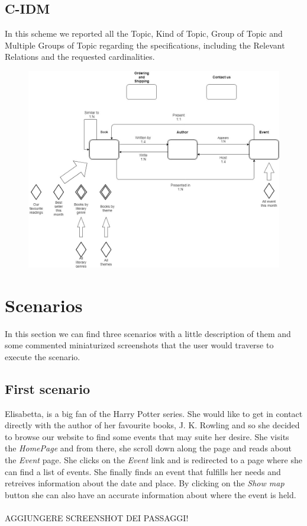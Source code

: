 \documentclass[12pt,a4paper]{article}
\begin{document}
\subsection{C-IDM}
In this scheme we reported all the Topic, Kind of Topic, Group of Topic and Multiple Groups of Topic regarding the specifications, including the Relevant Relations and the requested cardinalities.
\begin{figure}[h!]
\centering
\includegraphics[width=0.9\linewidth]{imm.jpg}
\label{fig:IDM}
\end{figure}

\newpage
\section{Scenarios}
In this section we can find three scenarios with a little description of them and some commented miniaturized screenshots that the user would traverse to execute the scenario.
\subsection{First scenario}
Elisabetta, is a big fan of the Harry Potter series. She would like to get in contact directly with the author of her favourite books, J. K. Rowling and so she decided to browse our website to find some events that may suite her desire. She visits the \textit{HomePage} and from there, she scroll down along the page and reads about the \textit{Event} page. She clicks on the \textit{Event} link and is redirected to a page where she can find a list of events. She finally finds an event that fulfills her needs and retreives information about the date and place. By clicking on the \textit{Show map} button she can also have an accurate information about where the event is held.\\\\
AGGIUNGERE SCREENSHOT DEI PASSAGGI!
\end{document}
